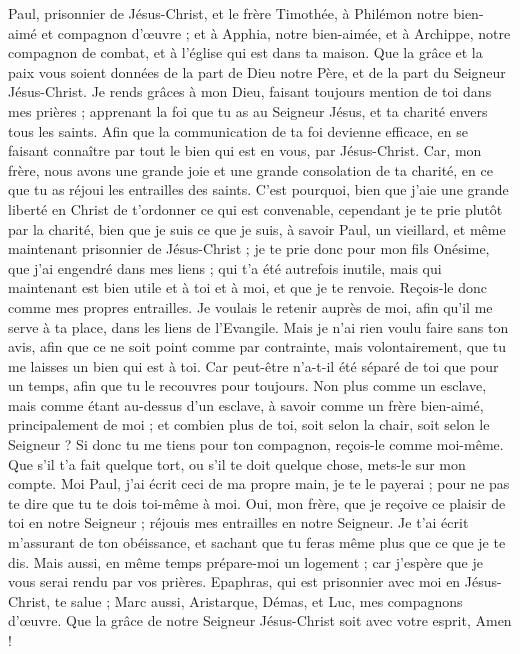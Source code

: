 \begin{multicols}{2}
\VerseOne{}Paul, prisonnier de Jésus-Christ, et le frère Timothée, à Philémon notre bien-aimé et compagnon d'œuvre ;
et à Apphia, notre bien-aimée, et à Archippe, notre compagnon de combat, et à l'église qui est dans ta maison.
Que la grâce et la paix vous soient données de la part de Dieu notre Père, et de la part du Seigneur Jésus-Christ.
Je rends grâces à mon Dieu, faisant toujours mention de toi dans mes prières ;
apprenant la foi que tu as au Seigneur Jésus, et ta charité envers tous les saints.
Afin que la communication de ta foi devienne efficace, en se faisant connaître par tout le bien qui est en vous, par  Jésus-Christ.
Car, mon frère, nous avons une grande joie et une grande consolation de ta charité, en ce que tu as réjoui les entrailles des saints.
C'est pourquoi, bien que j'aie une grande liberté en Christ de t’ordonner ce qui est convenable,
cependant je te prie plutôt par la charité, bien que je suis ce que je suis, à savoir Paul, un vieillard, et même maintenant prisonnier de Jésus-Christ ;
je te prie donc pour mon fils Onésime, que j'ai engendré dans mes liens ;
qui t'a été autrefois inutile, mais qui maintenant est bien utile et à toi et à moi, et que je te renvoie.
Reçois-le donc comme mes propres entrailles.
Je voulais le retenir auprès de moi, afin qu'il me serve à ta place, dans les liens de l'Evangile.
Mais je n'ai rien voulu faire sans ton avis, afin que ce ne soit point comme par contrainte, mais volontairement, que tu me laisses un bien qui est à toi.
Car peut-être n'a-t-il été séparé de toi que pour un temps, afin que tu le recouvres pour toujours.
Non plus comme un esclave, mais comme étant au-dessus d'un esclave, à savoir comme un frère bien-aimé, principalement de moi ; et combien plus de toi, soit selon la chair, soit selon le Seigneur ?
Si donc tu me tiens pour ton compagnon, reçois-le comme moi-même.
Que s'il t'a fait quelque tort, ou s'il te doit quelque chose, mets-le sur mon compte.
Moi Paul, j'ai écrit ceci de ma propre main, je te le payerai ; pour ne pas te dire que tu te dois toi-même à moi.
Oui, mon frère, que je reçoive ce plaisir de toi en notre Seigneur ; réjouis mes entrailles en notre Seigneur.
Je t'ai écrit m'assurant de ton obéissance, et sachant que tu feras même plus que ce que je te dis.
Mais aussi, en même temps prépare-moi un logement ; car j'espère que je vous serai rendu par vos prières.
Epaphras, qui est prisonnier avec moi en Jésus-Christ, te salue ;
Marc aussi, Aristarque, Démas, et Luc, mes compagnons d'œuvre.
Que la grâce de notre Seigneur Jésus-Christ soit avec votre esprit, Amen !
\PPE{}
\end{multicols}
